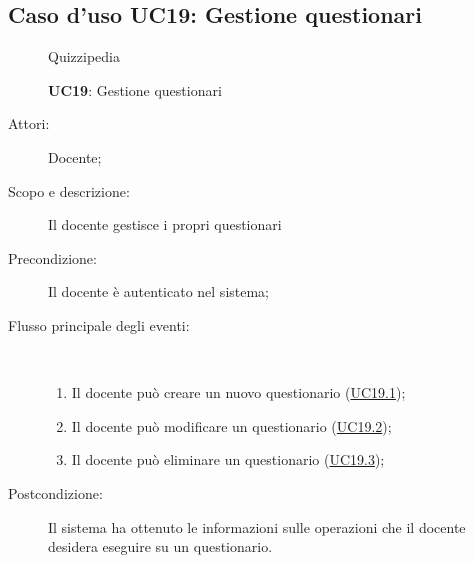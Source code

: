 \subsection{Caso d'uso UC19: Gestione questionari}
	\begin{figure}[H]
		\centering
		\begin{resizedtikzpicture}{\textwidth}
		\begin{umlsystem}[x=0, fill=lightgray!20]{Quizzipedia}
		\end{umlsystem}
		\end{resizedtikzpicture}
		\caption{\textbf{UC19}: Gestione questionari}
		\label{UC19}
	\end{figure}
\begin{description}
\item[Attori:] Docente;
\item[Scopo e descrizione:] Il docente gestisce i propri questionari
      \item[Precondizione:] Il docente è autenticato nel sistema;

        \item[Flusso principale degli eventi:] \ 
 \begin{enumerate}
          \item Il docente può creare un nuovo questionario (\hyperlink{UC19.1}{UC19.1});
          \item Il docente può modificare un questionario (\hyperlink{UC19.2}{UC19.2});
          \item Il docente può eliminare un questionario (\hyperlink{UC19.3}{UC19.3});

      \end{enumerate}
    \item[Postcondizione:] Il sistema ha ottenuto le informazioni sulle operazioni che il docente desidera eseguire su un questionario.
  \end{description}
\hypertarget{UC19.1}{}
